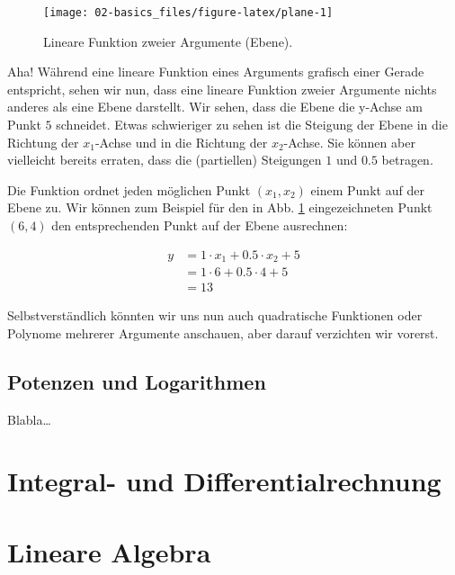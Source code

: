 \documentclass[
]{book}
\begin{document}
\begin{figure}

{\centering \texttt{[image: 02-basics\_files/figure-latex/plane-1]} 

}

\caption{Lineare Funktion zweier Argumente (Ebene).}\label{fig:plane}
\end{figure}

Aha! Während eine lineare Funktion eines Arguments grafisch einer Gerade entspricht, sehen wir nun, dass eine lineare Funktion zweier Argumente nichts anderes als eine Ebene darstellt. Wir sehen, dass die Ebene die y-Achse am Punkt \(5\) schneidet. Etwas schwieriger zu sehen ist die Steigung der Ebene in die Richtung der \(x_1\)-Achse und in die Richtung der \(x_2\)-Achse. Sie können aber vielleicht bereits erraten, dass die (partiellen) Steigungen \(1\) und \(0.5\) betragen.

Die Funktion ordnet jeden möglichen Punkt \((x_1,x_2)\) einem Punkt auf der Ebene zu. Wir können zum Beispiel für den in Abb. \ref{fig:plane} eingezeichneten Punkt \((6,4)\) den entsprechenden Punkt auf der Ebene ausrechnen:

\[ \begin{split}
y &= 1 \cdot x_1 + 0.5 \cdot x_2 + 5\\
&= 1 \cdot 6 + 0.5 \cdot 4 + 5\\
&= 13
\end{split}\]

Selbstverständlich könnten wir uns nun auch quadratische Funktionen oder Polynome mehrerer Argumente anschauen, aber darauf verzichten wir vorerst.

\hypertarget{potenzen-und-logarithmen}{%
\subsection{Potenzen und Logarithmen}\label{potenzen-und-logarithmen}}

Blabla\ldots{}

\hypertarget{integral--und-differentialrechnung}{%
\section{Integral- und Differentialrechnung}\label{integral--und-differentialrechnung}}

\hypertarget{lineare-algebra}{%
\section{Lineare Algebra}\label{lineare-algebra}}
\end{document}
